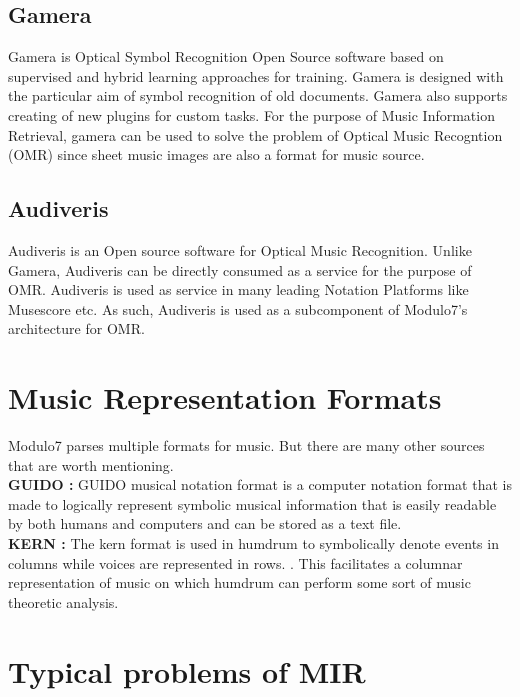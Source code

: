 \subsection{Gamera}

\noindent Gamera \cite{gamera} is Optical Symbol Recognition Open Source software based on supervised and hybrid learning approaches for training. Gamera is designed with the particular aim of symbol recognition of old documents. Gamera also supports creating of new plugins for custom tasks. For the purpose of Music Information Retrieval, gamera can be used to solve the problem of Optical Music Recogntion (OMR) since sheet music images are also a format for music source.

\subsection{Audiveris}

\noindent Audiveris is an Open source software for Optical Music Recognition. Unlike Gamera, Audiveris can be directly consumed as a service for the purpose of OMR.  Audiveris is used as service in many leading Notation Platforms like Musescore etc. As such, Audiveris is used as a subcomponent of Modulo7's architecture for OMR. 

\section{Music Representation Formats}

\noindent Modulo7 parses multiple formats for music. But there are many other sources that are worth mentioning. \\

\noindent \textbf{GUIDO :} GUIDO musical notation format is a computer notation format that is made to logically represent symbolic musical information that is easily readable by both humans and computers and can be stored as a text file. \\

\noindent \textbf{KERN :} The kern format is used in humdrum to symbolically denote events in columns while voices are represented in rows. \cite{humdrum}. This facilitates a columnar representation of music on which humdrum can perform some sort of music theoretic analysis. 

\section{Typical problems of MIR}

